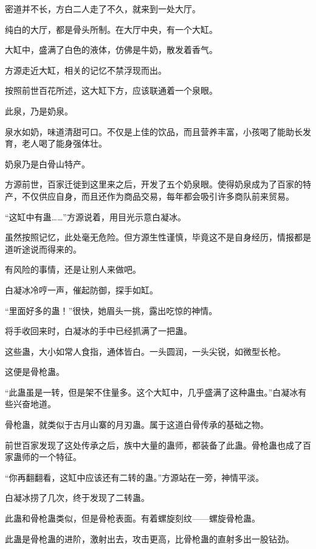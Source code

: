 
\begin{this_body}



密道并不长，方白二人走了不久，就来到一处大厅。

纯白的大厅，都是骨头所制。在大厅中央，有一个大缸。

大缸中，盛满了白色的液体，仿佛是牛奶，散发着香气。

方源走近大缸，相关的记忆不禁浮现而出。

按照前世百花所述，这大缸下方，应该联通着一个泉眼。

此泉，乃是奶泉。

泉水如奶，味道清甜可口。不仅是上佳的饮品，而且营养丰富，小孩喝了能助长发育，老人喝了能身强体壮。

奶泉乃是白骨山特产。

方源前世，百家迁徙到这里来之后，开发了五个奶泉眼。使得奶泉成为了百家的特产，不仅供应自身，而且还作为商品交易，每年都会吸引许多商队前来贸易。

“这缸中有蛊……”方源说着，用目光示意白凝冰。

虽然按照记忆，此处毫无危险。但方源生性谨慎，毕竟这不是自身经历，情报都是道听途说而得来的。

有风险的事情，还是让别人来做吧。

白凝冰冷哼一声，催起防御，探手如缸。

“里面好多的蛊！”很快，她眉头一挑，露出吃惊的神情。

将手收回来时，白凝冰的手中已经抓满了一把蛊。

这些蛊，大小如常人食指，通体皆白。一头圆润，一头尖锐，如微型长枪。

这便是骨枪蛊。

“此蛊虽是一转，但是架不住量多。这个大缸中，几乎盛满了这种蛊虫。”白凝冰有些兴奋地道。

骨枪蛊，就类似于古月山寨的月刃蛊。属于这道白骨传承的基础之物。

前世百家发现了这处传承之后，族中大量的蛊师，都装备了此蛊。骨枪蛊也成了百家蛊师的一个特征。

“你再翻翻看，这缸中应该还有二转的蛊。”方源站在一旁，神情平淡。

白凝冰捞了几次，终于发现了二转蛊。

此蛊和骨枪蛊类似，但是骨枪表面。有着螺旋刻纹——螺旋骨枪蛊。

此蛊是骨枪蛊的进阶，激射出去，攻击更高，比骨枪蛊的直射多出一股钻劲。


\end{this_body}

